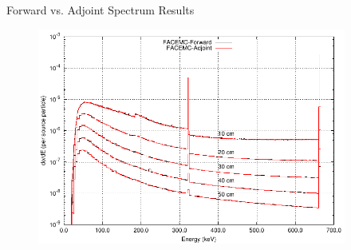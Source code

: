 \documentclass{beamer}
\begin{document}
\begin{frame}{Forward vs. Adjoint Spectrum Results}
  
  \begin{figure}[h!]
     \begin{center}
       \includegraphics[width=4in]{../document/chapters/code_overview/photon_spectrum_validation_comparison.pdf}
     \end{center}
   \end{figure}

\end{frame}

\end{document}

